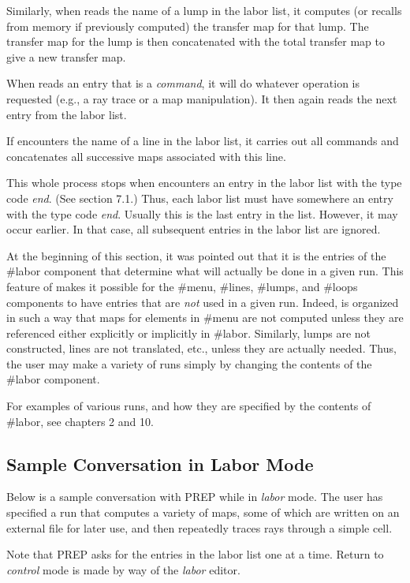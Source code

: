 Similarly, when \Mary reads the name of a lump in the labor list, it
computes (or recalls from memory if previously computed) the transfer map
for that lump. The transfer map for the lump is then concatenated with the
total transfer map to give a new transfer map.

When \Mary reads an entry that is a {\em command}, it will do whatever
operation is requested (e.g., a ray trace or a map manipulation). It then
again reads the next entry from the labor list.

If \Mary encounters the name of a line in the labor list, it carries out
all commands and concatenates all successive maps associated with this
line.

This whole process stops when \Mary encounters an entry in the labor list
with the type code {\em end}. (See section 7.1.) Thus, each labor list must
have somewhere an entry with the type code {\em end}. Usually this is the
last entry in the list. However, it may occur earlier. In that case, all
subsequent entries in the labor list are ignored.

At the beginning of this section, it was pointed out that it is the entries
of the \#labor component that determine what will actually be done in a
given \Mary run. This feature of \Mary makes it possible for the
\#menu, \#lines, \#lumps, and \#loops components to have entries that are
{\em not} used in a given \Mary run. Indeed, \Mary is organized in such a
way that maps for elements in \#menu are not computed unless they are
referenced either explicitly or implicitly in \#labor. Similarly, lumps are
not constructed, lines are not translated, etc., unless they are actually
needed. Thus, the user may make a variety of \Mary runs simply by changing
the contents of the \#labor component.

For examples of various \Mary runs, and how they are specified by the
contents of \#labor, see chapters 2 and 10.

\subsection{Sample Conversation in Labor Mode} Below is a sample
conversation with PREP while in {\em labor} mode. The user has specified a
\Mary run that computes a variety of maps, some of which are written on an
external file for later use, and then repeatedly traces rays through a
simple cell.

Note that PREP asks for the entries in the labor list one at a time. Return
to {\em control} mode is made by way of the {\em labor} editor.

